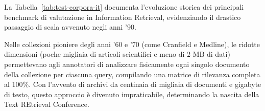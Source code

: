 La Tabella~\ref{tab:test-corpora-it} documenta l'evoluzione storica dei principali benchmark di valutazione in Information Retrieval, evidenziando il drastico passaggio di scala avvenuto negli anni '90.

\begin{table}[H]
\centering
\small
{}
\caption{Panoramica dimensionale dei corpora benchmark storici e raffronto con l'architettura TREC~\cite{manning2008}.}
\label{tab:test-corpora-it}
\end{table}

Nelle collezioni pioniere degli anni '60 e '70 (come Cranfield e Medline), le ridotte dimensioni (poche migliaia di articoli scientifici e meno di $2\text{ MB}$ di dati) permettevano agli annotatori di analizzare fisicamente ogni singolo documento della collezione per ciascuna query, compilando una matrice di rilevanza completa al $100\%$. Con l'avvento di archivi da centinaia di migliaia di documenti e gigabyte di testo, questo approccio \`e divenuto impraticabile, determinando la nascita della Text REtrieval Conference.

